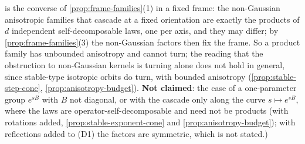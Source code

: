 \begin{proposition}
{is the converse of \ref{prop:frame-families}(1) in a fixed frame: the non-Gaussian anisotropic
families that cascade at a fixed orientation are exactly the products of $d$ independent
self-decomposable laws, one per axis, and they may differ; by \ref{prop:frame-families}(3) the
non-Gaussian factors then fix the frame. So a product family has unbounded anisotropy and
cannot turn; the reading that the obstruction to non-Gaussian kernels is turning alone does not
hold in general, since stable-type isotropic orbits do turn, with bounded anisotropy
(\ref{prop:stable-step-cone}, \ref{prop:anisotropy-budget}).
\textbf{Not claimed}: the case of a one-parameter group $e^{sB}$ with $B$ not diagonal, or with the
cascade only along the curve $s \mapsto e^{sB}$, where the laws are operator-self-decomposable and
need not be products (with rotations added, \ref{prop:stable-exponent-cone} and
\ref{prop:anisotropy-budget}); with reflections added to (D1) the factors
are symmetric, which is not stated.)}
\end{proposition}

